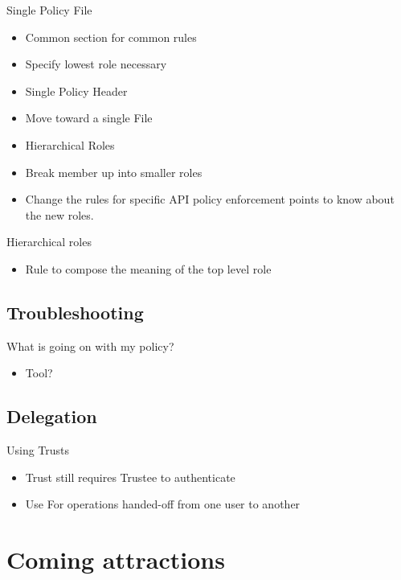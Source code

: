 \documentclass{beamer}
\begin{document}
    
\begin{frame}{Single Policy File}
  \begin{itemize}
  \item Common section for common rules
  \item Specify lowest role necessary
  \item Single Policy Header
  \item Move toward a single File
  \item Hierarchical Roles
  \item Break member up into smaller roles
  \item Change the rules for specific API policy enforcement points to know about the new roles.
  \end{itemize}
\end{frame}

\begin{frame}{Hierarchical roles}
  \begin{itemize}
  \item Rule to compose the meaning of the top level role
  \end{itemize}
\end{frame}

\subsection{Troubleshooting}

\begin{frame}{What is going on with my policy?}
  \begin{itemize}
  \item Tool?
  \end{itemize}
\end{frame}



\subsection{Delegation}


\begin{frame}{Using Trusts}
  \begin{itemize}
  \item Trust still requires Trustee to authenticate
  \item Use For operations handed-off from one user to another
  \end{itemize}
\end{frame}


\section {Coming attractions}
\end{document}
